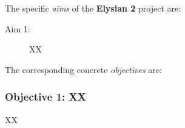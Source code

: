\documentclass[a4paper,11pt]{article}
\newcommand{\project}[1]{\textbf{#1}\xspace}
\newcommand{\SECURITY}{\project{Elysian 2}}
\newcommand{\TheProject}{\SECURITY}
\begin{document}
The specific \emph{aims} of the \TheProject{} project are:

\begin{description}
\item[Aim 1:] XX


\end{description}

The corresponding concrete \emph{objectives} are: 


\subsubsection*{Objective 1: XX}
\vspace{-6pt}
XX

\newpage

\label{bibliography}

%
%
%
\end{document}
